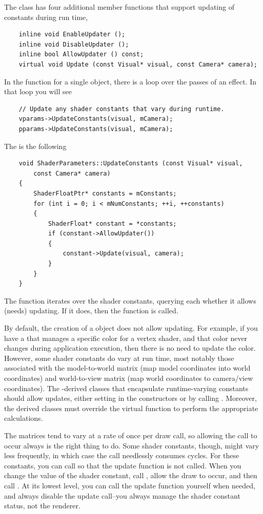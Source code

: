\documentclass{article}
\begin{document}
The class has four additional member functions that support updating of
constants during run time,
\begin{verbatim}
    inline void EnableUpdater ();
    inline void DisableUpdater ();
    inline bool AllowUpdater () const;
    virtual void Update (const Visual* visual, const Camera* camera);
\end{verbatim}
In the  function for a single  object,
there is a loop over the passes of an effect.  In that loop you will see
\begin{verbatim}
    // Update any shader constants that vary during runtime.
    vparams->UpdateConstants(visual, mCamera);
    pparams->UpdateConstants(visual, mCamera);
\end{verbatim}
The  is the following
\begin{verbatim}
    void ShaderParameters::UpdateConstants (const Visual* visual,
        const Camera* camera)
    {
        ShaderFloatPtr* constants = mConstants;
        for (int i = 0; i < mNumConstants; ++i, ++constants)
        {
            ShaderFloat* constant = *constants;
            if (constant->AllowUpdater())
            {
                constant->Update(visual, camera);
            }
        }
    }
\end{verbatim}
The function iterates over the shader constants, querying each whether it
allows (needs) updating.  If it does, then the 
function is called.

By default, the creation of a  object does not allow
updating.  For example, if you have a  that manages a
specific color for a vertex shader, and that color never changes during
application execution, then there is no need to update the color.  However,
some shader constants do vary at run time, most notably those associated
with the model-to-world matrix (map model coordinates into world coordinates)
and world-to-view matrix (map world coordinates to camera/view coordinates).
The -derived classes that encapsulate runtime-varying
constants should allow updates, either setting  in the
constructors or by calling .  Moreover, the derived
classes must override the virtual function  to
perform the appropriate calculations.

The matrices tend to vary at a rate of once per draw call,
so allowing the  call to occur always is the
right thing to do.  Some shader constants, though, might vary less
frequently, in which case the  call needlessly consumes cycles.
For these constants, you can call  so that the update
function is not called.  When you change the value of the shader constant,
call , allow the draw to occur, and then call
.  At its lowest level, you can call the update
function yourself when needed, and always disable the update call--you
always manage the shader constant status, not the renderer.
\end{document}
